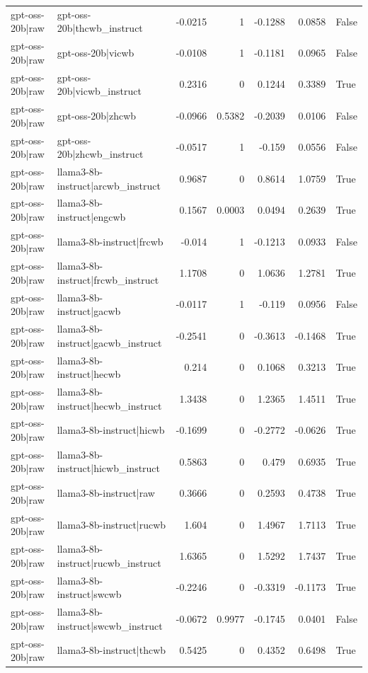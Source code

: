 \begin{table}
\begin{tabular}{l l r r r r l}
gpt-oss-20b|raw & gpt-oss-20b|thcwb_instruct & -0.0215 & 1 & -0.1288 & 0.0858 & False \\
gpt-oss-20b|raw & gpt-oss-20b|vicwb & -0.0108 & 1 & -0.1181 & 0.0965 & False \\
gpt-oss-20b|raw & gpt-oss-20b|vicwb_instruct & 0.2316 & 0 & 0.1244 & 0.3389 & True \\
gpt-oss-20b|raw & gpt-oss-20b|zhcwb & -0.0966 & 0.5382 & -0.2039 & 0.0106 & False \\
gpt-oss-20b|raw & gpt-oss-20b|zhcwb_instruct & -0.0517 & 1 & -0.159 & 0.0556 & False \\
gpt-oss-20b|raw & llama3-8b-instruct|arcwb_instruct & 0.9687 & 0 & 0.8614 & 1.0759 & True \\
gpt-oss-20b|raw & llama3-8b-instruct|engcwb & 0.1567 & 0.0003 & 0.0494 & 0.2639 & True \\
gpt-oss-20b|raw & llama3-8b-instruct|frcwb & -0.014 & 1 & -0.1213 & 0.0933 & False \\
gpt-oss-20b|raw & llama3-8b-instruct|frcwb_instruct & 1.1708 & 0 & 1.0636 & 1.2781 & True \\
gpt-oss-20b|raw & llama3-8b-instruct|gacwb & -0.0117 & 1 & -0.119 & 0.0956 & False \\
gpt-oss-20b|raw & llama3-8b-instruct|gacwb_instruct & -0.2541 & 0 & -0.3613 & -0.1468 & True \\
gpt-oss-20b|raw & llama3-8b-instruct|hecwb & 0.214 & 0 & 0.1068 & 0.3213 & True \\
gpt-oss-20b|raw & llama3-8b-instruct|hecwb_instruct & 1.3438 & 0 & 1.2365 & 1.4511 & True \\
gpt-oss-20b|raw & llama3-8b-instruct|hicwb & -0.1699 & 0 & -0.2772 & -0.0626 & True \\
gpt-oss-20b|raw & llama3-8b-instruct|hicwb_instruct & 0.5863 & 0 & 0.479 & 0.6935 & True \\
gpt-oss-20b|raw & llama3-8b-instruct|raw & 0.3666 & 0 & 0.2593 & 0.4738 & True \\
gpt-oss-20b|raw & llama3-8b-instruct|rucwb & 1.604 & 0 & 1.4967 & 1.7113 & True \\
gpt-oss-20b|raw & llama3-8b-instruct|rucwb_instruct & 1.6365 & 0 & 1.5292 & 1.7437 & True \\
gpt-oss-20b|raw & llama3-8b-instruct|swcwb & -0.2246 & 0 & -0.3319 & -0.1173 & True \\
gpt-oss-20b|raw & llama3-8b-instruct|swcwb_instruct & -0.0672 & 0.9977 & -0.1745 & 0.0401 & False \\
gpt-oss-20b|raw & llama3-8b-instruct|thcwb & 0.5425 & 0 & 0.4352 & 0.6498 & True \\

\end{tabular}
\end{table}
